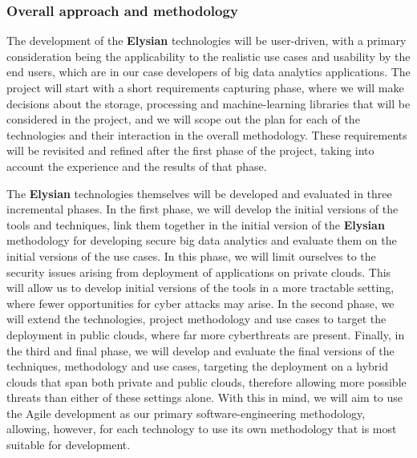 \documentclass[a4paper,11pt]{article}
\newcommand{\project}[1]{\textbf{#1}\xspace}
\newcommand{\SECURITY}{\project{Elysian}}
\newcommand{\TheProject}{\SECURITY}
\begin{document}
\subsubsection{Overall approach and methodology}


The development of the \TheProject{} technologies will be user-driven, with a primary consideration being the applicability to the realistic use cases and usability by the end users, which are in our case developers of big data analytics applications. The project will start with a short requirements capturing phase, where we will make decisions about the storage, processing and machine-learning libraries that will be considered in the project, and we will scope out the plan for each of the technologies and their interaction in the overall methodology. These requirements will be revisited and refined after the first phase of the project, taking into account the experience and the results of that phase.

The \TheProject{} technologies themselves will be developed and evaluated in three incremental phases. In the first phase, we will develop the initial versions of the tools and techniques, link them together in the initial version of the \TheProject{} methodology for developing secure big data analytics and evaluate them on the initial versions of the use cases. In this phase, we will limit ourselves to the security issues arising from deployment of applications on private clouds. This will allow us to develop initial versions of the tools in a more tractable setting, where fewer opportunities for cyber attacks may arise. In the second phase, we will extend the technologies, project methodology and use cases to target the deployment in public clouds, where far more cyberthreats are present. Finally, in the third and final phase, we will develop and evaluate the final versions of the techniques, methodology and use cases, targeting the deployment on a hybrid clouds that span both private and public clouds, therefore allowing more possible threats than either of these settings alone. With this in mind, we will aim to use the Agile development as our primary software-engineering methodology, allowing, however, for each technology to use its own methodology that is most suitable for development.
\end{document}

